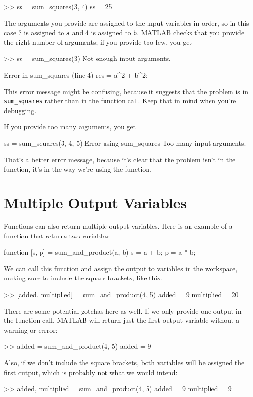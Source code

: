\begin{code}
>> ss = sum_squares(3, 4)
ss = 25
\end{code}

The arguments you provide are assigned to the input variables in
order, so in this case 3 is assigned to \lstinline{a} and 4 is assigned to
\lstinline{b}.  MATLAB checks that you provide the right number of arguments;
if you provide too few, you get

\begin{code}
>> ss = sum_squares(3)
Not enough input arguments.

Error in sum_squares (line 4)
    res = a^2 + b^2;
\end{code}

This error message might be confusing, because it suggests that
the problem is in \lstinline{sum_squares} rather than in the function call.
Keep that in mind when you're debugging.

If you provide too many arguments, you get

\begin{code}
ss = sum_squares(3, 4, 5)
Error using sum_squares
Too many input arguments.
\end{code}

That's a better error message, because it's clear that the problem isn't in the function, it's in the way we're using the function.

\section{Multiple Output Variables}

Functions can also return multiple output variables.  Here is an example of a function that returns two variables:
\begin{code}
function [s, p] = sum_and_product(a, b) 
    s = a + b;
    p = a * b;
\end{code}

We can call this function and assign the output to variables in the workspace, making sure to include the square brackets, like this:
\begin{code}
    >> [added, multiplied] = sum_and_product(4, 5)
    added =
         9
    multiplied =
        20
\end{code}

There are some potential gotchas here as well.  If we only provide one output in the function call, MATLAB will return just the first output variable without a warning or errror:
\begin{code}
    >> added = sum_and_product(4, 5)
    added =
         9    
\end{code}
Also, if we don't include the square brackets, both variables will be assigned the first output, which is probably not what we would intend:
\begin{code}
    >> added, multiplied = sum_and_product(4, 5)
    added =
         9
    multiplied =
         9
\end{code}

